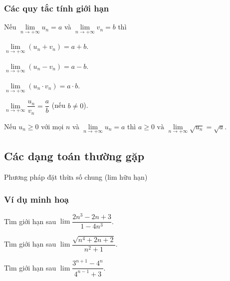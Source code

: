 	\subsubsection{Các quy tắc tính giới hạn}
	\begin{tc} 
		\begin{enumEX}[a)]{1}
			\item Nếu $\lim \limits_{n \rightarrow+\infty} u_{n}=a$ và $\lim \limits_{n \rightarrow+\infty} v_{n}=b$ thì 
			\begin{enumEX}[-)]{2}
				\item 	$\lim \limits_{n \rightarrow+\infty}\left(u_{n}+v_{n}\right)=a+b$.
				\item   $\lim \limits_{n \rightarrow+\infty}\left(u_{n}-v_{n}\right)=a-b$. 
				\item $\lim \limits_{n \rightarrow+\infty}\left(u_{n} \cdot v_{n}\right)=a \cdot b$.
				\item $\lim \limits_{n \rightarrow+\infty} \dfrac{u_{n}}{v_{n}}=\dfrac{a}{b}$ (nếu $b \neq 0$).
			\end{enumEX}
			\item Nếu $u_{n} \geq 0$ với mọi $n$ và $\lim \limits_{n \rightarrow+\infty} u_{n}=a$ thì $
			a \geq 0 \text { và } \lim \limits_{n \rightarrow+\infty} \sqrt{u_{n}}=\sqrt{a}$.
		\end{enumEX}
		
	\end{tc}
\subsection{Các dạng toán thường gặp}
\begin{dang}{Phương pháp đặt thừa số chung (lim hữu hạn)}
	
\end{dang}
\subsubsection{Ví dụ minh hoạ}
\begin{vd}%
	Tìm giới hạn sau $\lim\dfrac{2n^3-2n+3}{1-4n^3}$.
	\loigiai{
		\[\lim\dfrac{2n^3-2n+3}{1-4n^3}=\lim\dfrac{2-\dfrac{2}{n^2}+\dfrac{3}{n^3}}{\dfrac{1}{n^3}-4}=-\dfrac{1}{2}.\]}
\end{vd}
\begin{vd}%
	Tìm giới hạn sau $\lim\dfrac{\sqrt{n^4+2n+2}}{n^2+1}$.
	\loigiai{
		\[\lim\dfrac{\sqrt{n^4+2n+2}}{n^2+1} = \lim\dfrac{\sqrt{1+\dfrac{2}{n^3}+\dfrac{2}{n^4}}}{1+\dfrac{1}{n^2}}=1.\]}
\end{vd}
\begin{vd}%
	Tìm giới hạn sau $\lim\dfrac{3^{n+1}-4^n}{4^{n-1}+3}$.
	\loigiai{
		\[\lim\dfrac{3^{n+1}-4^n}{4^{n-1}+3} = \lim\dfrac{9\cdot 3^{n-1}-4\cdot 4^{n-1}}{4^{n-1}+3}=\lim\dfrac{9\cdot\left(\dfrac{3}{4}\right)^{n-1}-4}{1+3\cdot\left(\dfrac{1}{4}\right)^{n-1}}=-4.\]}
\end{vd}

